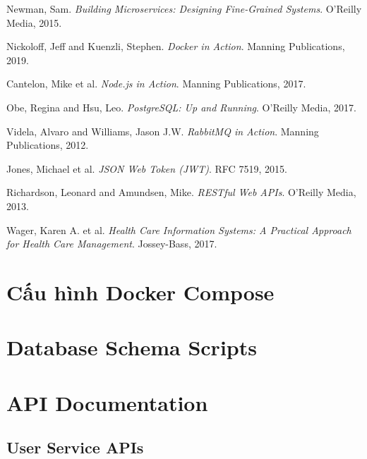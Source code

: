 \documentclass[12pt,a4paper]{report}
\begin{document}
\begin{thebibliography}{99}

Newman, Sam. \textit{Building Microservices: Designing Fine-Grained Systems}. O'Reilly Media, 2015.

Nickoloff, Jeff and Kuenzli, Stephen. \textit{Docker in Action}. Manning Publications, 2019.

Cantelon, Mike et al. \textit{Node.js in Action}. Manning Publications, 2017.

Obe, Regina and Hsu, Leo. \textit{PostgreSQL: Up and Running}. O'Reilly Media, 2017.

Videla, Alvaro and Williams, Jason J.W. \textit{RabbitMQ in Action}. Manning Publications, 2012.

Jones, Michael et al. \textit{JSON Web Token (JWT)}. RFC 7519, 2015.

Richardson, Leonard and Amundsen, Mike. \textit{RESTful Web APIs}. O'Reilly Media, 2013.

Wager, Karen A. et al. \textit{Health Care Information Systems: A Practical Approach for Health Care Management}. Jossey-Bass, 2017.

\end{thebibliography}

\appendix

\chapter{Cấu hình Docker Compose}

\chapter{Database Schema Scripts}

\chapter{API Documentation}
\section{User Service APIs}
\end{document}
